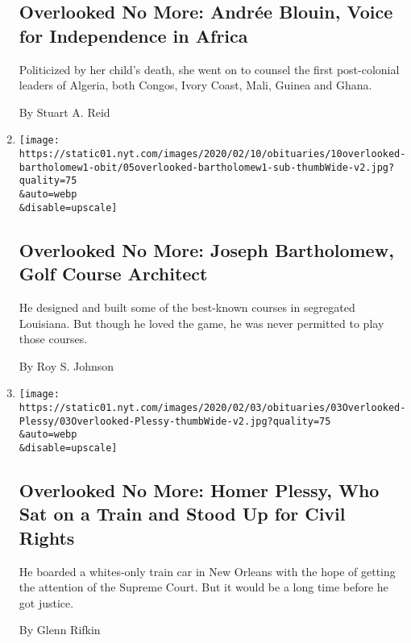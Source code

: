 \begin{enumerate}
  \hypertarget{overlooked-no-more-andruxe9e-blouin-voice-for-independence-in-africa}{%
  \subsection{Overlooked No More: Andrée Blouin, Voice for Independence
  in
  Africa}\label{overlooked-no-more-andruxe9e-blouin-voice-for-independence-in-africa}}

  Politicized by her child's death, she went on to counsel the first
  post-colonial leaders of Algeria, both Congos, Ivory Coast, Mali,
  Guinea and Ghana.

  By Stuart A. Reid
\item
  \href{/2020/02/05/obituaries/joseph-bartholomew-overlooked-black-history-month.html}{}

  \texttt{[image: https://static01.nyt.com/images/2020/02/10/obituaries/10overlooked-bartholomew1-obit/05overlooked-bartholomew1-sub-thumbWide-v2.jpg?quality=75\\\&auto=webp\\\&disable=upscale]}

  \hypertarget{overlooked-no-more-joseph-bartholomew-golf-course-architect}{%
  \subsection{Overlooked No More: Joseph Bartholomew, Golf Course
  Architect}\label{overlooked-no-more-joseph-bartholomew-golf-course-architect}}

  He designed and built some of the best-known courses in segregated
  Louisiana. But though he loved the game, he was never permitted to
  play those courses.

  By Roy S. Johnson
\item
  \href{/2020/01/31/obituaries/homer-plessy-overlooked-black-history-month.html}{}

  \texttt{[image: https://static01.nyt.com/images/2020/02/03/obituaries/03Overlooked-Plessy/03Overlooked-Plessy-thumbWide-v2.jpg?quality=75\\\&auto=webp\\\&disable=upscale]}

  \hypertarget{overlooked-no-more-homer-plessy-who-sat-on-a-train-and-stood-up-for-civil-rights}{%
  \subsection{Overlooked No More: Homer Plessy, Who Sat on a Train and
  Stood Up for Civil
  Rights}\label{overlooked-no-more-homer-plessy-who-sat-on-a-train-and-stood-up-for-civil-rights}}

  He boarded a whites-only train car in New Orleans with the hope of
  getting the attention of the Supreme Court. But it would be a long
  time before he got justice.

  By Glenn Rifkin
\end{enumerate}

